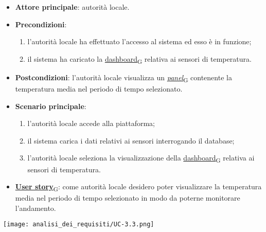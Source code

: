 \begin{itemize}
	\item \textbf{Attore principale}: autorità locale.
	\item \textbf{Precondizioni}:
	      \begin{enumerate}
		      \item l'autorità locale ha effettuato l'accesso al sistema ed esso è in funzione;
		      \item il sistema ha caricato la \href{https://7last.github.io/docs/pb/documentazione-interna/glossario\#dashboard}{dashboard\textsubscript{G}} relativa ai sensori di temperatura.
	      \end{enumerate}
	\item \textbf{Postcondizioni}: l'autorità locale visualizza un \href{https://7last.github.io/docs/pb/documentazione-interna/glossario\#panel}{\textit{panel}\textsubscript{G}} contenente la temperatura media nel periodo di tempo selezionato.
	\item \textbf{Scenario principale}:
	      \begin{enumerate}
		      \item l'autorità locale accede alla piattaforma;
		      \item il sistema carica i dati relativi ai sensori interrogando il database;
		      \item l'autorità locale seleziona la visualizzazione della \href{https://7last.github.io/docs/pb/documentazione-interna/glossario\#dashboard}{dashboard\textsubscript{G}} relativa ai sensori di temperatura.
	      \end{enumerate}
	\item \href{https://7last.github.io/docs/pb/documentazione-interna/glossario\#user-story}{\textbf{User story}\textsubscript{G}}: come autorità locale desidero poter visualizzare la temperatura media nel periodo di tempo selezionato
	      in modo da poterne monitorare l'andamento.
\end{itemize}
\begin{center}
	\texttt{[image: analisi\_dei\_requisiti/UC-3.3.png]}
\end{center}


